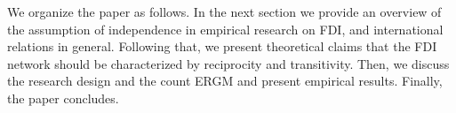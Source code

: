 \documentclass[reqno,onecolumn,letterpaper,12pt]{article}
\begin{document}




We organize the paper as follows. In the next section we provide an overview of the assumption of independence in empirical research on FDI, and international relations in general. Following that, we present theoretical claims that the FDI network should be characterized by reciprocity and transitivity. Then, we discuss the research design and the count ERGM and present empirical results. Finally, the paper concludes.



\end{document}
